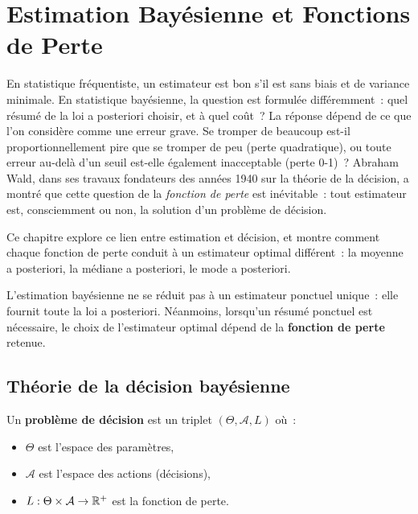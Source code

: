 \chapter{Estimation Bay\'esienne et Fonctions de Perte}
\label{ch:estimation}

En statistique fr\'equentiste, un estimateur est \og bon \fg s'il est sans biais et de variance minimale. En statistique bay\'esienne, la question est formul\'ee diff\'eremment~: quel r\'esum\'e de la loi a posteriori choisir, et \`a quel co\^ut~? La r\'eponse d\'epend de ce que l'on consid\`ere comme une erreur grave. Se tromper de beaucoup est-il proportionnellement pire que se tromper de peu (perte quadratique), ou toute erreur au-del\`a d'un seuil est-elle \'egalement inacceptable (perte 0-1)~? Abraham Wald, dans ses travaux fondateurs des ann\'ees 1940 sur la th\'eorie de la d\'ecision, a montr\'e que cette question de la \emph{fonction de perte} est in\'evitable~: tout estimateur est, consciemment ou non, la solution d'un probl\`eme de d\'ecision.

Ce chapitre explore ce lien entre estimation et d\'ecision, et montre comment chaque fonction de perte conduit \`a un estimateur optimal diff\'erent~: la moyenne a posteriori, la m\'ediane a posteriori, le mode a posteriori.

\begin{intuition}[title=\textbf{Id\'ee centrale}]
L'estimation bay\'esienne ne se r\'eduit pas \`a un estimateur ponctuel
unique~: elle fournit toute la loi a posteriori. N\'eanmoins, lorsqu'un
r\'esum\'e ponctuel est n\'ecessaire, le choix de l'estimateur optimal
d\'epend de la \textbf{fonction de perte} retenue.
\end{intuition}

\section{Th\'eorie de la d\'ecision bay\'esienne}

\begin{definition}
Un \textbf{probl\`eme de d\'ecision} est un triplet $(\Theta, \mathcal{A}, L)$
o\`u~:
\begin{itemize}
  \item $\Theta$ est l'espace des param\`etres,
  \item $\mathcal{A}$ est l'espace des actions (d\'ecisions),
  \item $L : \Theta \times \mathcal{A} \to \mathbb{R}^+$ est la fonction de perte.
\end{itemize}
\end{definition}

